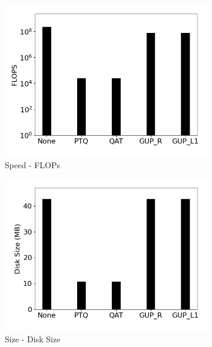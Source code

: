 \begin{figure}[]
\begin{subfigure}{0.19\textwidth}
        \includegraphics[width=1\textwidth]{other/figures/Resnet18_CIFAR10_Laptop/FLOPS.png}
        \caption{Speed - FLOPs}
    \end{subfigure}
    \begin{subfigure}{0.19\textwidth}
        \includegraphics[width=1\textwidth]{other/figures/Resnet18_CIFAR10_Laptop/Size.png}
        \caption{Size - Disk Size}
    \end{subfigure}
    \begin{subfigure}{0.19\textwidth}

\end{subfigure}
\end{figure}
